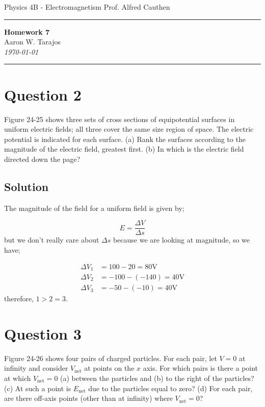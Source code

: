 \documentclass{article}
\newcommand{\V}{\text{V}}
\begin{document}
\noindent
Physics 4B - Electromagnetism \hfill Prof. Alfred Cauthen
\noindent\rule{\textwidth}{0.4pt}

\begin{center}
    \textbf{\LARGE Homework 7} \\
    \vspace{12pt}
    \large Aaron W. Tarajos \\
    \textit{\today}
\end{center}

\noindent\rule{\textwidth}{0.4pt}

\section*{Question 2}
Figure 24-25 shows three sets of cross sections of equipotential surfaces in uniform electric fields; all three cover the same size region of space. The electric potential is indicated for each surface. (a) Rank the surfaces according to the magnitude of the electric field, greatest first. (b) In which is the electric field directed down the page?

\subsection*{Solution}
The magnitude of the field for a uniform field is given by;

\begin{equation}
	E = \frac{\Delta V}{\Delta s}
\end{equation}
but we don't really care about $\Delta s$ because we are looking at magnitude, so we have;

\begin{align*}
	\Delta V_1 &= 100 - 20 = 80 \V \\
	\Delta V_2 &= -100 - (-140) = 40 \V \\
	\Delta V_3 &= -50 - (-10) = 40 \V
\end{align*}
therefore, $1 > 2 = 3$.

\section*{Question 3}
Figure 24-26 shows four pairs of charged particles. For each pair, let
$V = 0$ at infinity and consider $V_\text{net}$ at points on the $x$ axis. For which pairs
is there a point at which $V_\text{net} = 0$ (a) between the particles and (b) to the right of the particles? (c) At such a point is $E_\text{net}$ due to the particles equal to zero? (d) For each pair, are there off-axis points (other than at infinity) where $V_\text{net} = 0$?
\end{document}
